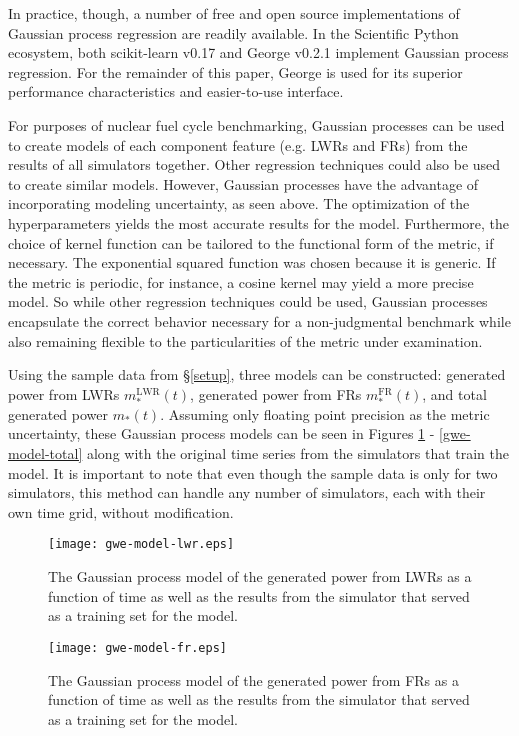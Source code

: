 \documentclass{ntmanuscript}
\newcommand{\LWR}{\mathrm{LWR}}
\newcommand{\FR}{\mathrm{FR}}
\begin{document}
In practice, though, a number of free and open source implementations of Gaussian
process regression are readily available. In the Scientific Python ecosystem, both
scikit-learn v0.17 \cite{scikit-learn} and George v0.2.1 \cite{hodlr} implement
Gaussian process regression. For the remainder of this paper, George is used
for its superior performance characteristics and easier-to-use interface.

For purposes of nuclear fuel cycle benchmarking, Gaussian processes can be used to
create models of each component feature (e.g. LWRs and FRs) from the
results of all simulators together. Other regression techniques could also be used
to create similar models.  However, Gaussian processes have the advantage of
incorporating modeling uncertainty, as seen above. The optimization of the
hyperparameters yields the most accurate results for the model. Furthermore, the
choice of kernel function can be tailored to the functional form of the metric, if
necessary. The exponential squared function was chosen because it is generic. If the
metric is periodic, for instance, a cosine kernel may yield a more precise model.
So while other regression techniques could be used, Gaussian processes
encapsulate the correct behavior necessary for a non-judgmental benchmark while
also remaining flexible to the particularities of the metric under examination.

Using the sample data from \S\ref{setup}, three models can be constructed:
generated power from LWRs $m_*^{\LWR}(t)$, generated power from FRs $m_*^{\FR}(t)$,
and total generated power $m_*(t)$. Assuming only floating point precision as
the metric uncertainty, these Gaussian process models can be seen in Figures
\ref{gwe-model-lwr} - \ref{gwe-model-total} along with the original time series
from the simulators that train the model.
It is important to note that even though the sample data is only for two simulators,
this method can handle any number of simulators, each with their own time grid,
without modification.

\begin{figure}[htb]
\centering
\texttt{[image: gwe-model-lwr.eps]}
\caption{The Gaussian process model of the generated power from LWRs
as a function of time as well as the results from the simulator that served as a
training set for the model.}
\label{gwe-model-lwr}
\end{figure}

\begin{figure}[htb]
\centering
\texttt{[image: gwe-model-fr.eps]}
\caption{The Gaussian process model of the generated power from FRs
as a function of time as well as the results from the simulator that served as a
training set for the model.}
\label{gwe-model-fr}
\end{figure}
\end{document}
